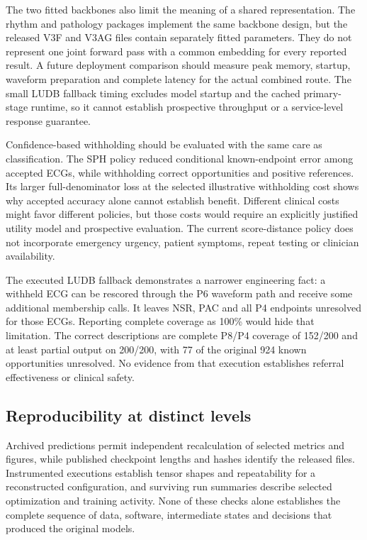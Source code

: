 The two fitted backbones also limit the meaning of a shared representation. The rhythm and pathology packages implement the same backbone design, but the released V3F and V3AG files contain separately fitted parameters. They do not represent one joint forward pass with a common embedding for every reported result. A future deployment comparison should measure peak memory, startup, waveform preparation and complete latency for the actual combined route. The small LUDB fallback timing excludes model startup and the cached primary-stage runtime, so it cannot establish prospective throughput or a service-level response guarantee.

Confidence-based withholding should be evaluated with the same care as classification. The SPH policy reduced conditional known-endpoint error among accepted ECGs, while withholding correct opportunities and positive references. Its larger full-denominator loss at the selected illustrative withholding cost shows why accepted accuracy alone cannot establish benefit. Different clinical costs might favor different policies, but those costs would require an explicitly justified utility model and prospective evaluation. The current score-distance policy does not incorporate emergency urgency, patient symptoms, repeat testing or clinician availability.

The executed LUDB fallback demonstrates a narrower engineering fact: a withheld ECG can be rescored through the P6 waveform path and receive some additional membership calls. It leaves NSR, PAC and all P4 endpoints unresolved for those ECGs. Reporting complete coverage as 100\% would hide that limitation. The correct descriptions are complete P8/P4 coverage of 152/200 and at least partial output on 200/200, with 77 of the original 924 known opportunities unresolved. No evidence from that execution establishes referral effectiveness or clinical safety.

\subsection{Reproducibility at distinct levels}
\label{sec:reproducibility}
Archived predictions permit independent recalculation of selected metrics and figures, while published checkpoint lengths and hashes identify the released files. Instrumented executions establish tensor shapes and repeatability for a reconstructed configuration, and surviving run summaries describe selected optimization and training activity. None of these checks alone establishes the complete sequence of data, software, intermediate states and decisions that produced the original models.

